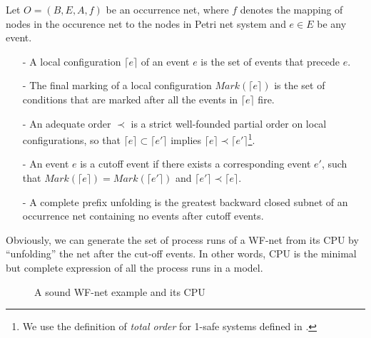 \documentclass{llncs}
\begin{document}
\begin{definition}\label{def:cpu}
Let $O=(B,E,A,f)$ be an occurrence net, where $f$ denotes the mapping of nodes in the occurence net to the nodes in Petri net system and $e\in E$ be any event.
	\begin{itemize}
		\item[-] A local configuration $\lceil e\rceil$ of an event $e$ is the set of events that precede $e$.
		\item[-] The final marking of a local configuration $Mark(\lceil e\rceil)$ is the set of conditions that are marked after all the events in $\lceil e\rceil$ fire.
		\item[-] An adequate order $\prec$ is a strict well-founded partial order on local configurations, so that $\lceil e\rceil\subset\lceil e'\rceil$ implies $\lceil e\rceil\prec\lceil e'\rceil$\footnote{We use the definition of \emph{total order} for 1-safe systems defined in \cite{esparza2002improvement}.}.
		\item[-] An event $e$ is a cutoff event if there exists a corresponding event $e'$, such that $Mark(\lceil e\rceil)=Mark(\lceil e'\rceil)$ and $\lceil e'\rceil\prec\lceil e\rceil$.
		\item[-] A complete prefix unfolding is the greatest backward closed subnet of an occurrence net containing no events after cutoff events.
	\end{itemize}
\end{definition}

Obviously, we can generate the set of process runs of a WF-net from its CPU by ``unfolding'' the net after the cut-off events. In other words, CPU is the minimal but complete expression of all the process runs in a model.

\begin{figure}[htbp]
\centering
{}
\caption{A sound WF-net example and its CPU\label{fig:examplePetriAndCpu}}
\end{figure}
\end{document}
